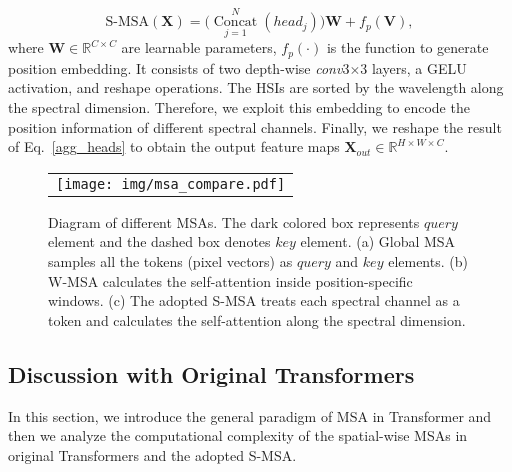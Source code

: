 \documentclass[10pt,twocolumn,letterpaper]{article}
\begin{document}
\begin{equation}
\text{S-MSA}(\mathbf{X}) =\big(\mathop{\text{Concat}}\limits_{j=1}^{N}(head_{j})\big)\mathbf{W} + f_p(\mathbf{V}),
\label{agg_heads}
\end{equation}
where $\mathbf{W} \in \mathbb{R}^{C \times C}$ are learnable parameters, $f_p(\cdot)$ is the function to generate position embedding. It consists of two depth-wise \emph{conv}3$\times$3 layers, a GELU activation, and reshape operations. The HSIs are sorted by the wavelength along the spectral dimension. Therefore, we exploit this embedding to encode the position information of different spectral channels. Finally, we reshape the result of Eq.~\eqref{agg_heads} to obtain the output feature maps $\mathbf{X}_{out} \in \mathbb{R}^{H\times W \times C}$. 



\begin{figure*}[t]
	\begin{center}
		\begin{tabular}[t]{c} \hspace{-2mm} 
			\texttt{[image: img/msa\_compare.pdf]}
		\end{tabular}
	\end{center}
	\vspace{-5mm}
	\caption{\small Diagram of different MSAs. The dark colored box represents $query$ element and the dashed box denotes $key$ element. (a) Global MSA samples all the tokens (pixel vectors) as $query$ and $key$ elements. (b) W-MSA calculates the self-attention inside position-specific windows. (c) The adopted S-MSA treats each spectral channel as a token and calculates the self-attention along the spectral dimension. }
	\label{fig:attan_compare}
	\vspace{-1mm}
\end{figure*}

\subsection{Discussion with Original Transformers}
\label{sec:discuss}
In this section, we  introduce the general paradigm of MSA in Transformer and then we analyze the computational complexity of the spatial-wise MSAs in original Transformers and the adopted S-MSA.
\end{document}
